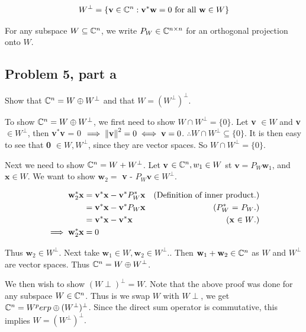 \[
W^\perp = \{\textbf{v} \in \mathbb{C}^n: \textbf{v}^*\textbf{w} = 0 \text{ for all } \textbf{w} \in W\}
\]

For any subspace $W \subseteq \mathbb{C}^n$, we write $P_W \in \mathbb{C}^{n\times n}$ for an orthogonal projection onto $W$.

\subsection{Problem 5, part a}
Show that $\mathbb{C}^n = W \oplus W^\perp$ and that $W = (W^{\perp})^\perp.$

\partbreak

\begin{solution}

To show $\mathbb{C}^n = W \oplus W^\perp$, we first need to show $W\cap W^\perp =\{0\}$. Let \textbf{v} $\in W$ and \textbf{v} $\in W^\perp$, then \textbf{v}$^*$\textbf{v} = 0 $\implies \norm{\textbf{v}}^2 = 0 \iff \textbf{v} = 0$. $\therefore W\cap W^\perp \subseteq \{0\}$. It is then easy to see that \textbf{0} $\in W, W^\perp$, since they are vector spaces. So $W\cap W^\perp =\{0\}$.

\jump
Next we need to show $\mathbb{C}^n = W + W^\perp$. Let \textbf{v} $\in \mathbb{C}^n, w_1 \in W$ st $\textbf{v} = P_W\textbf{w}_1$, and $\textbf{x} \in W$. We want to show $\textbf{w}_2 = $ \textbf{v} - $P_W\textbf{v} \in W^\perp$. 

\alignbreak
\begin{align}
    \textbf{w}_2^*\textbf{x} &= \textbf{v}^*\textbf{x} - \textbf{v}^* P_{W}^*\textbf{x} &\text{(Definition of inner product.)}\nonumber\\
    &= \textbf{v}^*\textbf{x} - \textbf{v}^*P_W\textbf{x} &\text{($P_W^*$ = $P_W$.)}\nonumber\\
    &= \textbf{v}^*\textbf{x} - \textbf{v}^*\textbf{x} &\text{(\textbf{x} $\in W$.)}\nonumber\\
    \implies \textbf{w}_2^*\textbf{x} &= 0\nonumber
\end{align}
\alignbreak

Thus $\textbf{w}_2 \in W^\perp$. Next take $\textbf{w}_1 \in W, \textbf{w}_2 \in W^\perp.$. Then $\textbf{w}_1 + \textbf{w}_2 \in \mathbb{C}^n$ as $W$ and $W^\perp$ are vector spaces. Thus $\mathbb{C}^n = W\oplus W^\perp$. 

We then wish to show $(W\perp)^\perp = W$. Note that the above proof was done for any subspace $W \in \mathbb{C}^{n}$. Thus is we swap $W$ with $W\perp$, we get $\mathbb{C}^n = W^perp\oplus (W^\perp)^\perp$. Since the direct sum operator is commutative, this implies $W = (W^\perp)^\perp.$
\end{solution}

